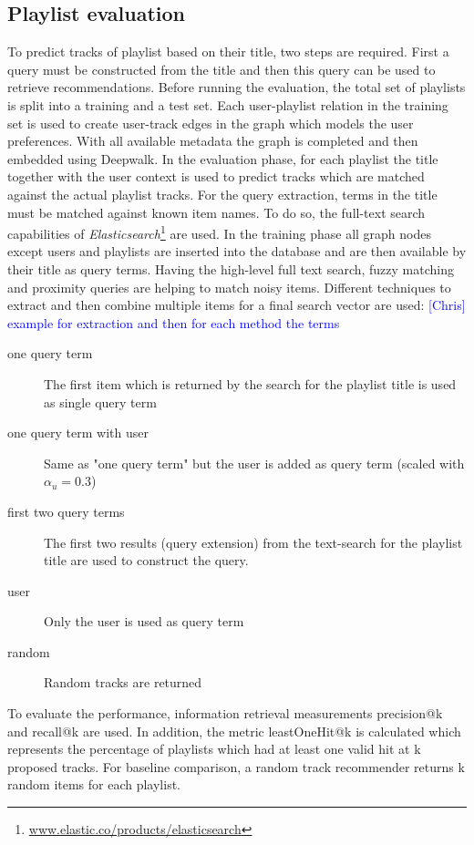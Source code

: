 \documentclass[sigconf]{acmart}
\newcommand{\ce}[1]{\textcolor{blue}{[Chris] #1}}
\newcommand{\ce}[1]{}
\begin{document}
\subsection{Playlist evaluation}
\label{subsec:playlist_eval}
To predict tracks of playlist based on their title, two steps are required. First a query must be constructed from the title and then this query can be used to retrieve recommendations. Before running the evaluation, the total set of playlists is split into a training and a test set. Each user-playlist relation in the training set is used to create user-track edges in the graph which models the user preferences. With all available metadata the graph is completed and then embedded using Deepwalk. In the evaluation phase, for each playlist the title together with the user context is used to predict tracks which are matched against the actual playlist tracks. For the query extraction, terms in the title must be matched against known item names. To do so, the full-text search capabilities of \emph{Elasticsearch}\footnote{\url{www.elastic.co/products/elasticsearch}} are used. In the training phase all graph nodes except users and playlists are inserted into the database and are then available by their title as query terms. Having the high-level full text search, fuzzy matching and proximity queries are helping to match noisy items. Different techniques to extract and then combine multiple items for a final search vector are used:
\ce{example for extraction and then for each method the terms}
\begin{description}
	\item[one query term] The first item which is returned by the search for the playlist title is used as single query term
	\item[one query term with user] Same as "one query term" but the user is added as query term (scaled with $ \alpha_{u} = 0.3 $)
	\item[first two query terms] The first two results (query extension) from the text-search for the playlist title are used to construct the query.
	\item[user] Only the user is used as query term
	\item[random] Random tracks are returned
\end{description}


To evaluate the performance, information retrieval measurements precision@k and recall@k are used. In addition, the metric leastOneHit@k is calculated which represents the percentage of playlists which had at least one valid hit at k proposed tracks. For baseline comparison, a random track recommender returns k random items for each playlist.
\end{document}
